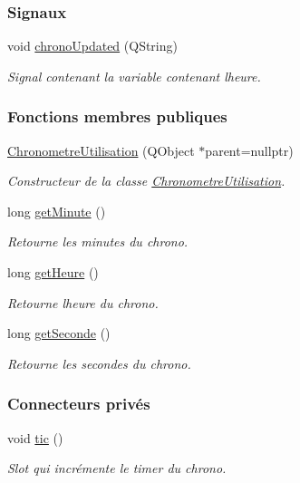 \subsubsection*{Signaux}
\begin{DoxyCompactItemize}
\item 
void \hyperlink{class_chronometre_utilisation_ae4e197f888e33feb23801d2edcf2c4a5}{chrono\+Updated} (Q\+String)
\begin{DoxyCompactList}\small\item\em Signal contenant la variable contenant l\textquotesingle{}heure. \end{DoxyCompactList}\end{DoxyCompactItemize}
\subsubsection*{Fonctions membres publiques}
\begin{DoxyCompactItemize}
\item 
\hyperlink{class_chronometre_utilisation_a499bd70e5056ddb71df022848d1e345e}{Chronometre\+Utilisation} (Q\+Object $\ast$parent=nullptr)
\begin{DoxyCompactList}\small\item\em Constructeur de la classe \hyperlink{class_chronometre_utilisation}{Chronometre\+Utilisation}. \end{DoxyCompactList}\item 
long \hyperlink{class_chronometre_utilisation_a2c137076fcda83a14a5bad01b915196f}{get\+Minute} ()
\begin{DoxyCompactList}\small\item\em Retourne les minutes du chrono. \end{DoxyCompactList}\item 
long \hyperlink{class_chronometre_utilisation_a03c732560e07a2014129a7da8bb2307b}{get\+Heure} ()
\begin{DoxyCompactList}\small\item\em Retourne l\textquotesingle{}heure du chrono. \end{DoxyCompactList}\item 
long \hyperlink{class_chronometre_utilisation_a62dde8f710b8e015ba6124e8b44fe2da}{get\+Seconde} ()
\begin{DoxyCompactList}\small\item\em Retourne les secondes du chrono. \end{DoxyCompactList}\end{DoxyCompactItemize}
\subsubsection*{Connecteurs privés}
\begin{DoxyCompactItemize}
\item 
void \hyperlink{class_chronometre_utilisation_ab8dc7eb855ec9e24daefa4e185051d2e}{tic} ()
\begin{DoxyCompactList}\small\item\em Slot qui incrémente le timer du chrono. \end{DoxyCompactList}\end{DoxyCompactItemize}

